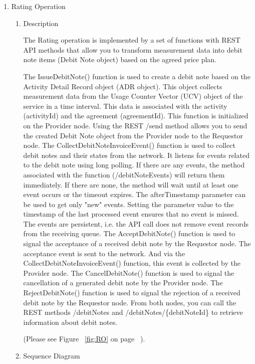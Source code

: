 \begin{enumerate}


\item  Rating Operation

\begin{enumerate}

\item Description

The Rating operation is implemented by a set of functions with REST API methods that allow you to transform measurement 
data into debit note items (Debit Note object) based on the agreed price plan.

The IssueDebitNote() function is used to create a debit note based on the Activity Detail Record object (ADR object).
This object collects measurement data from the Usage Counter Vector (UCV) object of the service in a time interval.
This data is associated with the activity (activityId) and the agreement (agreementId). This function is initialized on the Provider node.
Using the REST /send method allows you to send the created Debit Note object from the Provider node to the Requestor node.
The CollectDebitNoteInvoiceEvent() function is used to collect debit notes and their states from the network.
It listens for events related to the debit note using long polling.
If there are any events, the method associated with the function (/debitNoteEvents) will return them immediately.
If there are none, the method will wait until at least one event occurs or the timeout expires.
The afterTimestamp parameter can be used to get only "new" events.
Setting the parameter value to the timestamp of the last processed event ensures that no event is missed.
The events are persistent, i.e. the API call does not remove event records from the receiving queue.
The AcceptDebitNote() function is used to signal the acceptance of a received debit note by the Requestor node.
The acceptance event is sent to the network. And via the CollectDebitNoteInvoiceEvent() function, this event is collected
by the Provider node.
The CancelDebitNote() function is used to signal the cancellation of a generated debit note by the Provider node.
The RejectDebitNote() function is used to signal the rejection of a received debit note by the Requestor node.
From both nodes, you can call the REST methods /debitNotes and /debitNotes/\{debitNoteId\} to retrieve information about
debit notes.

(Please see Figure ~\ref{fig:RO} on page ~\pageref{fig:RO}).

\item Sequence Diagram


\end{enumerate}
\end{enumerate}
